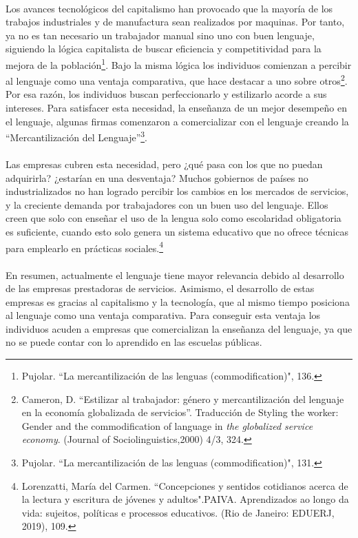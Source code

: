 \documentclass{article}
\begin{document}
    \paragraph{}
    Los avances tecnológicos del capitalismo han provocado que la mayoría de los trabajos industriales y de manufactura sean realizados por maquinas. Por tanto, ya no es tan necesario un trabajador manual sino uno con buen lenguaje, siguiendo la lógica capitalista de buscar eficiencia y competitividad para la mejora de la población\footnote{Pujolar. ``La mercantilización de las lenguas (commodification)", 136.}. Bajo la misma lógica los individuos comienzan a percibir al lenguaje como una ventaja comparativa, que hace destacar a uno sobre otros\footnote{Cameron, D. ``Estilizar al trabajador: género y mercantilización del lenguaje en la economía globalizada de servicios”. Traducción de Styling the worker: Gender and the commodification of language in \emph{the globalized service economy}. (Journal of Sociolinguistics,2000) 4/3, 324.}. Por esa razón, los individuos buscan perfeccionarlo y estilizarlo acorde a sus intereses. Para satisfacer esta necesidad, la enseñanza de un mejor desempeño en el lenguaje, algunas firmas comenzaron a comercializar con el lenguaje creando la ``Mercantilización del Lenguaje”\footnote{Pujolar. ``La mercantilización de las lenguas (commodification)", 131.}. 

    \paragraph{}
    Las empresas cubren esta necesidad, pero ¿qué pasa con los que no puedan adquirirla? ¿estarían en una desventaja? Muchos gobiernos de países no industrializados no han logrado percibir los cambios en los mercados de servicios, y la creciente demanda por trabajadores con un buen uso del lenguaje. Ellos creen que solo con enseñar el uso de la lengua solo como escolaridad obligatoria es suficiente, cuando esto solo genera un sistema educativo que no ofrece técnicas para emplearlo en prácticas sociales.\footnote{Lorenzatti, María del Carmen. ``Concepciones y sentidos cotidianos acerca de la lectura y escritura de jóvenes y adultos".PAIVA. Aprendizados ao longo da vida: sujeitos, políticas e processos educativos. (Rio de Janeiro: EDUERJ, 2019), 109.}

    \paragraph{}
    En resumen, actualmente el lenguaje tiene mayor relevancia debido al desarrollo de las empresas prestadoras de servicios. Asimismo, el desarrollo de estas empresas es gracias al capitalismo y la tecnología, que al mismo tiempo posiciona al lenguaje como una ventaja comparativa. Para conseguir esta ventaja los individuos acuden a empresas que comercializan la enseñanza del lenguaje, ya que no se puede contar con lo aprendido en las escuelas públicas.
\end{document}
